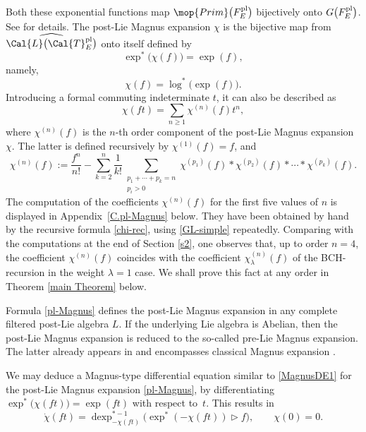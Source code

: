 \documentclass[pdftex]{sigma}
\numberwithin{equation}{section}
\begin{document}
Both these exponential functions map $\mop{Prim}\big(F^{\rm pl}_E\big)$ bijectively onto $G\big(F^{\rm pl}_E\big)$. See \cite{ELM2015} for details. The post-Lie Magnus expansion $\chi$ is the bijective map from $\widehat{\Cal{L}\big(\Cal{T}^{\rm pl}_E\big)}$ onto itself defined by
\begin{displaymath}
\exp^{*}\big(\chi(f)\big) = \exp(f),
\end{displaymath}
namely,
\begin{equation}
\label{pl-Magnus}
\chi(f) = \log^{\ast}\big(\exp(f)\big).
\end{equation}
Introducing a formal commuting indeterminate $t$, it can also be described as
\[
\chi(ft) = \sum_{n\geq 1}{\chi^{(n)}(f)}t^n,
\]
where $\chi^{(n)}(f)$ is the $n$-th order component of the post-Lie Magnus expansion $\chi$. The latter is defined recursively by $\chi^{(1)}(f) = f$, and \cite{ELM2015, EI2018, EIM2017}
\begin{equation}\label{chi-rec}
\chi^{(n)}(f)
:= \frac{f^{n}}{n!} - \sum_{k=2}^{n}{\frac{1}{k!}\sum_{\substack{p_{1} + \cdots + p_{k}
= n \\ p_{i}>0}}{\chi^{(p_{1})}(f)\ast \chi^{(p_{2})}(f) \ast \cdots \ast \chi^{(p_{k})}(f)}}.
\end{equation}
The computation of the coefficients $\chi^{(n)}(f)$ for the first five values of $n$ is displayed in Appendix~\ref{C.pl-Magnus} below. They have been obtained by hand by the recursive formula \eqref{chi-rec}, using \eqref{GL-simple} repeatedly. Comparing with the computations at the end of Section \ref{s2}, one observes that, up to order $n=4$, the coefficient $\chi^{(n)}(f)$ coincides with the coefficient $\chi_\lambda^{(n)}(f)$ of the BCH-recursion in the weight $\lambda = 1$ case. We shall prove this fact at any order in Theorem \ref{main Theorem} below.

\begin{Remark}\label{rem1}
Formula \eqref{pl-Magnus} defines the post-Lie Magnus expansion in any complete filtered post-Lie algebra $L$. If the underlying Lie algebra is Abelian, then the post-Lie Magnus expansion is reduced to the so-called pre-Lie Magnus expansion. The latter already appears in \cite{AG81} and encompasses classical Magnus expansion \cite{WM54}.
\end{Remark}

\begin{Remark}\label{remMagnus1}
 We may deduce a Magnus-type differential equation similar to \eqref{MagnusDE1} for the post-Lie Magnus expansion \eqref{pl-Magnus}, by differentiating $\exp^{*}\big(\chi(ft)\big) = \exp(ft)$ with respect to~$t$. This results in
\begin{displaymath}
\dot{\chi}(ft) = \operatorname{dexp}^{\ast -1}_{- \chi(ft)}\big( \exp^*(- \chi(ft)) \rhd f \big), \qquad \chi(0)=0.
\end{displaymath}
\end{Remark}
\end{document}

